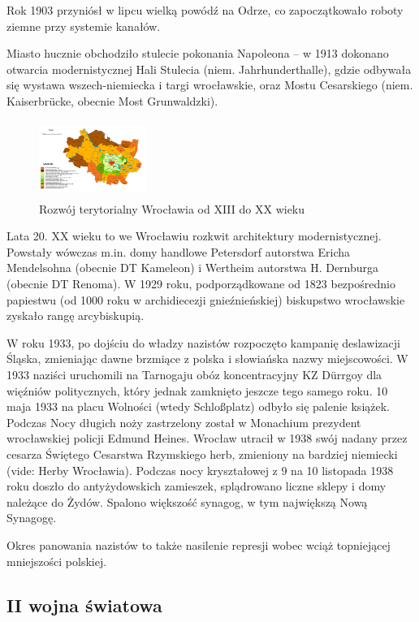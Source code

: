 \documentclass{article}
\begin{document}
Rok 1903 przyniósł w lipcu wielką powódź na Odrze, co zapoczątkowało roboty ziemne przy systemie kanałów.

Miasto hucznie obchodziło stulecie pokonania Napoleona – w 1913 dokonano otwarcia modernistycznej Hali Stulecia (niem. Jahrhunderthalle), gdzie odbywała się wystawa wszech-niemiecka i targi wrocławskie, oraz Mostu Cesarskiego (niem. Kaiserbrücke, obecnie Most Grunwaldzki).

\begin{figure}
    \includegraphics[width = 3.5cm, height = 2.5cm]{images/Zdjecie12.jpg}
    \caption{Rozwój terytorialny Wrocławia od XIII do XX wieku}
\end{figure}

Lata 20. XX wieku to we Wrocławiu rozkwit architektury modernistycznej. Powstały wówczas m.in. domy handlowe Petersdorf autorstwa Ericha Mendelsohna (obecnie DT Kameleon) i Wertheim autorstwa H. Dernburga (obecnie DT Renoma). W 1929 roku, podporządkowane od 1823 bezpośrednio papiestwu (od 1000 roku w archidiecezji gnieźnieńskiej) biskupstwo wrocławskie zyskało rangę arcybiskupią.

W roku 1933, po dojściu do władzy nazistów rozpoczęto kampanię deslawizacji Śląska, zmieniając dawne brzmiące z polska i słowiańska nazwy miejscowości. W 1933 naziści uruchomili na Tarnogaju obóz koncentracyjny KZ Dürrgoy dla więźniów politycznych, który jednak zamknięto jeszcze tego samego roku. 10 maja 1933 na placu Wolności (wtedy Schloßplatz) odbyło się palenie książek. Podczas Nocy długich noży zastrzelony został w Monachium prezydent wrocławskiej policji Edmund Heines. Wrocław utracił w 1938 swój nadany przez cesarza Świętego Cesarstwa Rzymskiego herb, zmieniony na bardziej niemiecki (vide: Herby Wrocławia). Podczas nocy kryształowej z 9 na 10 listopada 1938 roku doszło do antyżydowskich zamieszek, splądrowano liczne sklepy i domy należące do Żydów. Spalono większość synagog, w tym największą Nową Synagogę.

Okres panowania nazistów to także nasilenie represji wobec wciąż topniejącej mniejszości polskiej.
\newpage

\subsection{II wojna światowa}
\end{document}
